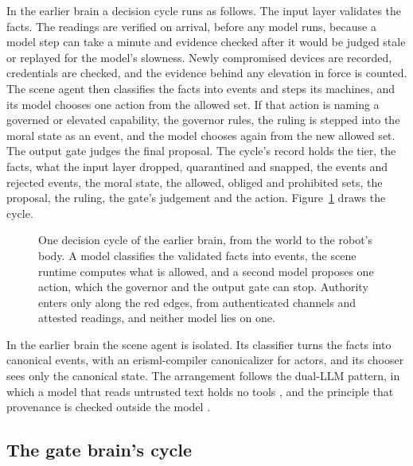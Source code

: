In the earlier brain a decision cycle runs as follows. The input layer validates the facts. The readings are verified on
arrival, before any model runs, because a model step can take a minute and evidence checked after it
would be judged stale or replayed for the model's slowness. Newly compromised devices are recorded,
credentials are checked, and the evidence behind any elevation in force is counted. The scene agent
then classifies the facts into events and steps its machines, and its model chooses one action from
the allowed set. If that action is  naming a governed or elevated
capability, the governor rules, the ruling is stepped into the moral state as an event, and the
model chooses again from the new allowed set. The output gate judges the final proposal. The cycle's
record holds the tier, the facts, what the input layer dropped, quarantined and snapped, the events
and rejected events, the moral state, the allowed, obliged and prohibited sets, the proposal, the
ruling, the gate's judgement and the action. Figure~\ref{fig:authority-path} draws the cycle.

\begin{figure}[t]
\centering
\resizebox{\textwidth}{!}{}
\caption{One decision cycle of the earlier brain, from the world to the robot's body. A model classifies the validated
facts into events, the scene runtime computes what is allowed, and a second model proposes one
action, which the governor and the output gate can stop. Authority enters only along the red edges,
from authenticated channels and attested readings, and neither model lies on one.}
\label{fig:authority-path}
\end{figure}

In the earlier brain the scene agent is isolated. Its classifier turns the facts into canonical events, with an
erisml-compiler canonicalizer for actors, and its chooser sees only the canonical state. The
arrangement follows the dual-LLM pattern, in which a model that reads untrusted text holds no
tools \cite{willison2023dualllm}, and the principle that provenance is checked outside the model
\cite{debenedetti2026camel}.

\subsection{The gate brain's cycle}\label{sec:home-gate}

